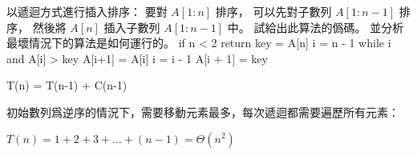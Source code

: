 \startEXERCISE
以遞迴方式進行插入排序：
要對 $A[1:n]$ 排序，
可以先對子數列 $A[1:n-1]$ 排序，
然後將 $A[n]$ 插入子數列 $A[1:n-1]$ 中。
試給出此算法的僞碼。
並分析最壞情況下的算法是如何運行的。
\stopEXERCISE
\startANSWER
{}
\startCLRSCODE
if n < 2
	return
key = A[n]
i = n - 1
while i  and A[i] > key
	A[i+1] = A[i]
	i = i - 1
A[i + 1] = key
\stopCLRSCODE

\startformula
T(n) = \startmathcases
{} \NC {} \NR
\NC T(n-1) + C(n-1)	\NC {} \NR
\stopmathcases
\stopformula

初始數列爲逆序的情況下，需要移動元素最多，每次遞迴都需要遍歷所有元素：

$T(n) = 1 + 2 + 3 + ... + (n-1) = \Theta(n^2)$
\stopANSWER
